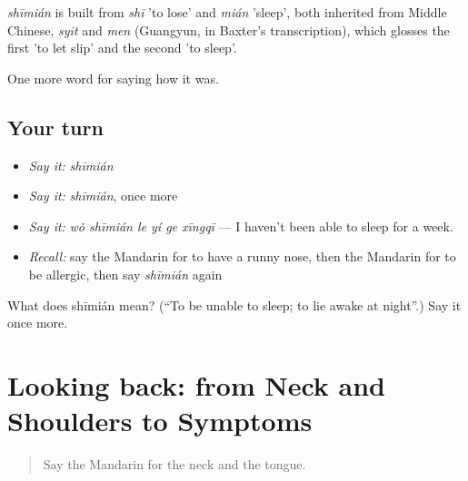 \begin{cousinweb}
\emph{shīmián} is built from \emph{shī} 'to lose' and \emph{mián} 'sleep', both inherited from Middle Chinese, \emph{syit} and \emph{men} (Guangyun, in Baxter's transcription), which glosses the first 'to let slip' and the second 'to sleep'.
\end{cousinweb}

\begin{grammarlens}[title={What you've built}]
One more word for saying how it was.
\end{grammarlens}

\subsection*{Your turn}
\begin{itemize}
\raggedright
  \item \emph{Say it:} \emph{shīmián}
  \item \emph{Say it:} \emph{shīmián}, once more
  \item \emph{Say it:} \emph{wǒ shīmián le yí ge xīngqī} — I haven't been able to sleep for a week.
  \item \emph{Recall:} say the Mandarin for to have a runny nose, then the Mandarin for to be allergic, then say \emph{shīmián} again
\end{itemize}

\begin{tcolorbox}[breakable,colback=teal!4,colframe=teal!35!black,title={Before you move on}]
What does shīmián mean? (\textquotedblleft{}To be unable to sleep; to lie awake at night\textquotedblright{}.) Say it once more.
\end{tcolorbox}
\section[(dialogue)]{Looking back: from Neck and Shoulders to Symptoms}

\label{lesson:ZH-R480-review-476-480}



\begin{quote}
Say the Mandarin for the neck and the tongue.
\end{quote}

